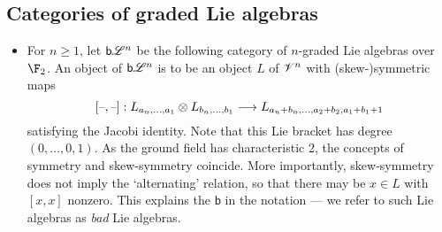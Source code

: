 \documentclass[11pt]{article}
\newcommand{\BadLie}[1]{\mathsf{b}{\scrL}^{#1}}%
\newcommand{\GR}[1]{\scrV^{#1}}%
\begin{document}
\begin{CategoriesOfInterest}
\subsection{Categories of graded Lie algebras}

\begin{itemize}
\setlength{\parindent}{.25in}
\item For $n\geq1$, let $\BadLie{n}$ be the following category of $n$-graded Lie algebras over $\F_2$. An object of $\BadLie{n}$ is to be an object $L$ of $\GR{n}$ with (skew-)symmetric maps
\[[\textup{--},\textup{--}]:L_{a_n,\ldots,a_1}\otimes L_{b_n,\ldots,b_1}\longrightarrow L_{a_n+b_n,\ldots,a_2+b_2,a_1+b_1+1}\]
satisfying the Jacobi identity. Note that this Lie bracket has degree $(0,\ldots,0,1)$. As the ground field has characteristic 2, the concepts of symmetry and skew-symmetry coincide. More importantly, skew-symmetry does not imply the `alternating' relation, so that there may be $x\in L$ with $[x,x]$ nonzero. This explains the $\mathsf{b}$ in the notation --- we refer to such Lie algebras as \emph{bad} Lie algebras.


\end{itemize}
\end{CategoriesOfInterest}
\end{document}

